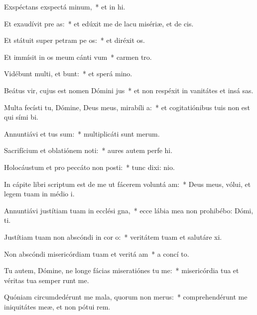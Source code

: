 \item Exspéctans exspectá minum,~* et in hi.
\item Et exaudívit pre as:~* et edúxit me de lacu misériæ, et de  cis.
\item Et státuit super petram pe os:~* et diréxit  os.
\item Et immísit in os meum cánti vum~* carmen  tro.
\item Vidébunt multi, et bunt:~* et sperá  mino.
\item Beátus vir, cujus est nomen Dómini  jus~* et non respéxit in vanitátes et insá sas.
\item Multa fecísti tu, Dómine, Deus meus, mirabíli a:~* et cogitatiónibus tuis non est qui sími  bi.
\item Annuntiávi et tus sum:~* multiplicáti sunt  merum.
\item Sacrifícium et oblatiónem noti:~* aures autem perfe hi.
\item Holocáustum et pro peccáto non posti:~* tunc dixi:  nio.
\item In cápite libri scriptum est de me ut fácerem voluntá am:~* Deus meus, vólui, et legem tuam in médio  i.
\item Annuntiávi justítiam tuam in ecclési gna,~* ecce lábia mea non prohibébo: Dómi,  ti.
\item Justítiam tuam non abscóndi in cor o:~* veritátem tuam et salutáre  xi.
\item Non abscóndi misericórdiam tuam et veritá am~* a concí to.
\item Tu autem, Dómine, ne longe fácias miseratiónes tu  me:~* misericórdia tua et véritas tua semper runt me.
\item Quóniam circumdedérunt me mala, quorum non  merus:~* comprehendérunt me iniquitátes meæ, et non pótui  rem.
